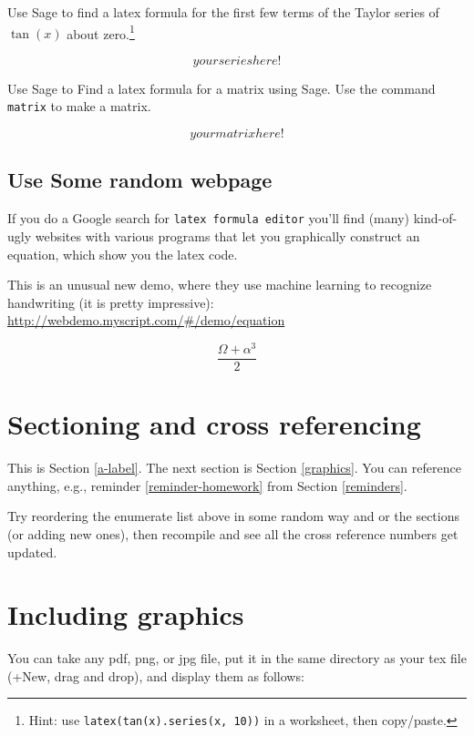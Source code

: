 \begin{exercise}
Use Sage to find a latex formula for the first few terms
of the Taylor series of $\tan(x)$ about
zero.\footnote{Hint: use {\tt latex(tan(x).series(x, 10))} in a worksheet, then copy/paste.}
\end{exercise}

$$
your series here!
$$


\begin{exercise}
Use Sage to Find a latex formula for a matrix using Sage.  Use the command {\tt matrix} to make a matrix.
\end{exercise}

$$
your matrix here!
$$




\subsection{Use Some random webpage}

If you do a Google search for {\tt latex formula editor}
you'll find (many) kind-of-ugly websites with
various programs that
let you graphically construct an equation, which show
you the latex code.

This is an unusual new demo, where they use machine learning
to recognize handwriting (it is pretty impressive):\\
\url{http://webdemo.myscript.com/#/demo/equation}

$$
\frac{\Omega +\alpha ^{3}} {2}
$$

\section{Sectioning and cross referencing\label{a-label}}
This is Section \ref{a-label}.  The next section is Section \ref{graphics}.
You can reference anything, e.g., reminder \ref{reminder-homework}
from Section \ref{reminders}.

\begin{exercise}
Try reordering the enumerate list above in some random way and or the sections
(or adding new ones), then recompile and see all the cross reference numbers
get updated.
\end{exercise}


\section{Including graphics\label{graphics}}

You can take any pdf, png, or jpg file, put it in the
same directory as your tex file (+New, drag and drop),
and display them as follows:

